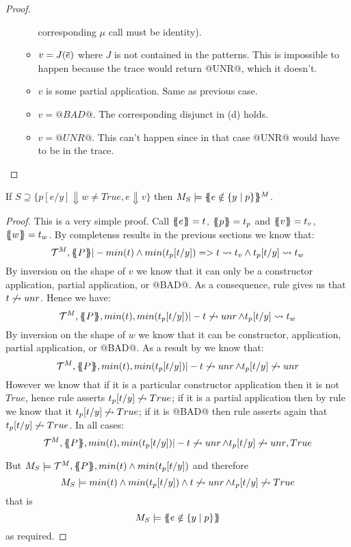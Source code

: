 \documentclass[preprint]{sigplanconf}
\begin{document}
\begin{proof}
\begin{itemize}
\begin{itemize}
                corresponding $\mu$ call must be identity).
          \item $v = J(\overline{e})$ where $J$ is not contained in the patterns. This is impossible to happen because
                the trace would return @UNR@, which it doesn't.
          \item $v$ is some partial application. Same as previous case.
          \item $v = @BAD@$. The corresponding disjunct in (d) holds. 
          \item $v = @UNR@$. This can't happen since in that case @UNR@ would have to be in the trace.
        \end{itemize}
\end{itemize}
\end{proof}


\begin{theorem} If $S \supseteq \{ p[e/y] \Downarrow w \neq True, e \Downarrow v \}$ 
                         then $M_S \models \{\!\!\{e \notin \{ y \mid p \}\}\!\!\}^M$.
\end{theorem}
\begin{proof} This is a very simple proof. Call $\{\!\!\{{e}\}\!\!\} = t$, $\{\!\!\{{p}\}\!\!\} = t_p$ and 
$\{\!\!\{{v}\}\!\!\} = t_v$, $\{\!\!\{{w}\}\!\!\} = t_w$. By completenss results in the previous sections we 
know that:
 \[ {\cal T}^M,\{\!\!\{P\}\!\!\} |- min(t) \land min(t_p[t/y]) => t \rightsquigarrow t_v \land t_p[t/y] \rightsquigarrow t_w \]
By inversion on the shape of $v$ we know that it can only be a constructor application, partial 
application, or @BAD@. As a consequence, rule  gives us that $t \not\rightsquigarrow \mathop{unr}$. 
Hence we have:
\[ {\cal T}^M,\{\!\!\{P\}\!\!\},min(t),min(t_p[t/y]) |- t \not\rightsquigarrow \mathop{unr} \land t_p[t/y] \rightsquigarrow t_w \]
By inversion on the shape of $w$ we know that it can be constructor, application, partial 
application, or @BAD@. As a result by  we know that:
\[ {\cal T}^M,\{\!\!\{P\}\!\!\},min(t),min(t_p[t/y]) |- t \not\rightsquigarrow \mathop{unr} \land t_p[t/y] \not\rightsquigarrow \mathop{unr} \]
However we know that if it is a particular constructor application then it is not $True$, hence
rule  asserts $t_p[t/y] \not\rightsquigarrow True$; 
if it is a partial application then by rule  we know that it $t_p[t/y] \not\rightsquigarrow True$;
if it is @BAD@ then rule  asserts again that $t_p[t/y] \not\rightsquigarrow True$. In all cases:
\[ {\cal T}^M,\{\!\!\{P\}\!\!\},min(t),min(t_p[t/y]) |- t \not\rightsquigarrow \mathop{unr} \land t_p[t/y] \not\rightsquigarrow \mathop{unr},True \]

But $M_S \models {\cal T}^M,\{\!\!\{P\}\!\!\}, min(t) \land min(t_p[t/y])$ and therefore 
     \[ M_S \models min(t) \land min(t_p[t/y]) \land t \not\rightsquigarrow \mathop{unr} \land t_p[t/y] \not\rightsquigarrow True \]
that is
     \[M_S \models \{\!\!\{e \notin \{ y \mid p \}\}\!\!\} \]
as required.
\end{proof}
\end{document}
